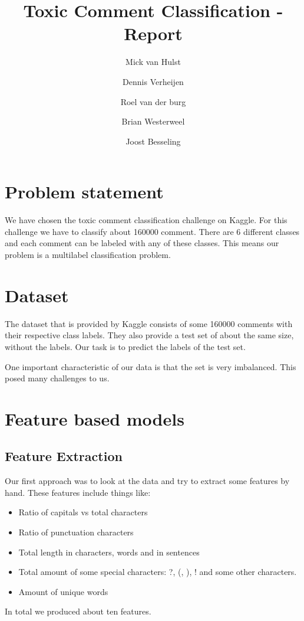 \documentclass[10pt, a4paper,twocolumn]{article}
\title{Toxic Comment Classification - Report}
\author{Mick van Hulst \and Dennis Verheijen \and Roel van der burg \and Brian Westerweel \and Joost Besseling}
\begin{document}
	\maketitle
	
	
	\section{Problem statement}
	We have chosen the toxic comment classification challenge on Kaggle. For this challenge we have to classify about 160000 comment. There are 6 different classes and each comment can be labeled with any of these classes. This means our problem is a multilabel classification problem.
	
	\section{Dataset}
	
	The dataset that is provided by Kaggle consists of some 160000 comments with their respective class labels. They also provide a test set of about the same size, without the labels. Our task is to predict the labels of the test set.
	
	One important characteristic of our data is that the set is very imbalanced. This posed many challenges to us.
	
	
	\section{Feature based models}
	\subsection{Feature Extraction}
	Our first approach was to look at the data and try to extract some features by hand. These features include things like: 
	\begin{itemize}
		\setlength\itemsep{0px}
		\item Ratio of capitals vs total characters
		\item Ratio of punctuation characters
		\item Total length in characters, words and in sentences
		\item Total amount of some special characters: ?, (, ), ! and some other characters.
		\item Amount of unique words		
	\end{itemize}
	In total we produced about ten features.
	
\end{document}
